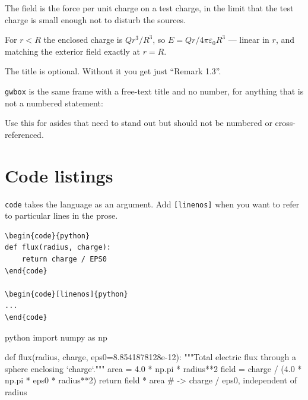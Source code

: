 \begin{definition}
\label{def:efield}
The field is the force per unit charge on a test charge, in the limit that the
test charge is small enough not to disturb the sources.
\end{definition}

\begin{example}
For $r<R$ the enclosed charge is $Qr^{3}/R^{3}$, so $E = Qr/4\pi\varepsilon_0R^{3}$
--- linear in $r$, and matching the exterior field exactly at $r=R$.
\end{example}

\begin{remark}
The title is optional. Without it you get just ``Remark 1.3''.
\end{remark}

\noindent
\verb|gwbox| is the same frame with a free-text title and no number, for
anything that is not a numbered statement:

\begin{gwbox}
Use this for asides that need to stand out but should not be numbered or
cross-referenced.
\end{gwbox}

\section{Code listings}

\verb|code| takes the language as an argument. Add \verb|[linenos]| when you
want to refer to particular lines in the prose.

\begin{verbatim}
\begin{code}{python}
def flux(radius, charge):
    return charge / EPS0
\end{code}

\begin{code}[linenos]{python}
...
\end{code}
\end{verbatim}

\begin{code}[linenos]{python}
import numpy as np

def flux(radius, charge, eps0=8.8541878128e-12):
    """Total electric flux through a sphere enclosing `charge`."""
    area = 4.0 * np.pi * radius**2
    field = charge / (4.0 * np.pi * eps0 * radius**2)
    return field * area          # -> charge / eps0, independent of radius
\end{code}


